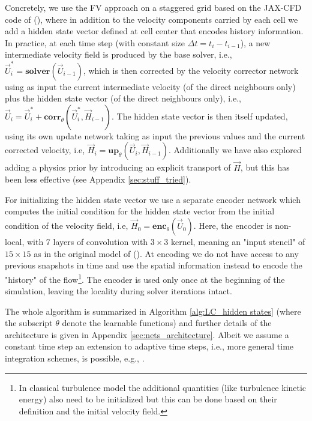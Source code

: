 Concretely, we use the FV approach on a staggered grid \cite{griebel1998numerical} based on the JAX-CFD code of \citeauthor{kochkov2021machine} (\citeyear{kochkov2021machine}), where in addition to the velocity components carried by each cell we add a hidden state vector defined at cell center that encodes history information. In practice, at each time step (with constant size $\Delta t = t_i - t_{i-1}$), a new intermediate velocity field is produced by the base solver, i.e., $\vec{U}^*_i =  \textbf{solver} ( \vec{U}_{i-1} )$, which is then corrected by the velocity corrector network using as input the current intermediate velocity (of the direct neighbours only) plus the hidden state vector (of the direct neighbours only), i.e., $\vec{U}_i = \vec{U}^*_i + \textbf{corr}_{\theta}(\vec{U}^*_i, \vec{H}_{i-1} )$. The hidden state vector is then itself updated, using its own update network taking as input the previous values and the current corrected velocity, i.e, $\vec{H}_{i} = \textbf{up}_{\theta} (\vec{U}_i, \vec{H}_{i-1} )$. Additionally we have also explored adding a physics prior by introducing an explicit transport of $\vec{H}$, but this has been less effective (see Appendix \ref{sec:stuff_tried}).

For initializing the hidden state vector we use a separate encoder network which computes the initial condition for the hidden state vector from the initial condition of the velocity field, i.e, $\vec{H}_0 = \textbf{enc}_{\theta}( \vec{U}_0 )$. Here, the encoder is non-local, with 7 layers of convolution with $3 \times 3$ kernel, meaning an "input stencil" of $15 \times 15$ as in the original model of \citeauthor{kochkov2021machine} (\citeyear{kochkov2021machine}). At encoding we do not have access to any previous snapshots in time and use the spatial information instead to encode the "history" of the flow\footnote{In classical turbulence model the additional quantities (like turbulence kinetic energy) also need to be initialized but this can be done based on their definition and the initial velocity field.}. The encoder is used only once at the beginning of the simulation, leaving the locality during solver iterations intact. 

The whole algorithm is summarized in Algorithm \ref{alg:LC_hidden states} (where the subscript $\theta$ denote the learnable functions) and further details of the architecture is given in Appendix \ref{sec:nets_architecture}. Albeit we assume a constant time step an extension to adaptive time steps, i.e., more general time integration schemes, is possible, e.g., \cite{chen2018neural,kang2023learning}.

